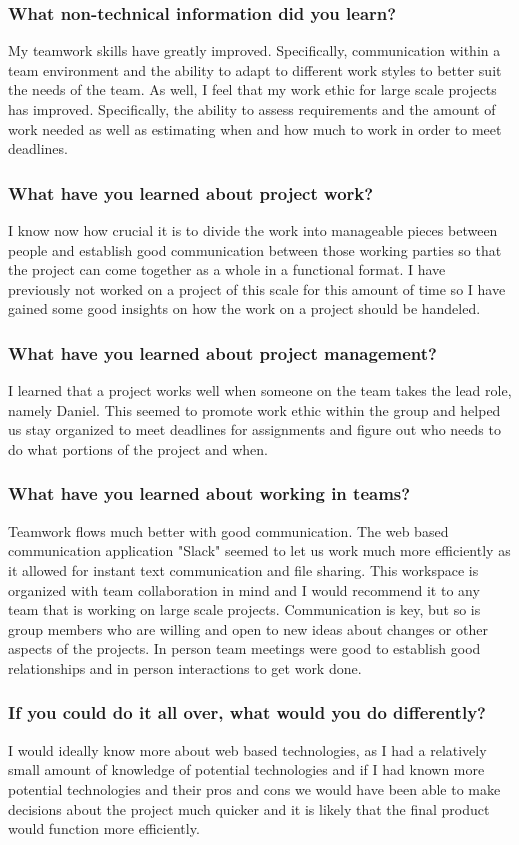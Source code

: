 \documentclass[journal,10pt,onecolumn,compsoc]{IEEEtran}
\begin{document}
    \subsubsection{What non-technical information did you learn?}
	My teamwork skills have greatly improved. Specifically, communication within a team environment and the ability to adapt to different work styles to better suit the needs of the team. As well, I feel that my work ethic for large scale projects has improved. Specifically, the ability to assess requirements and the amount of work needed as well as estimating when and how much to work in order to meet deadlines. 
    \subsubsection{What have you learned about project work?}
	I know now how crucial it is to divide the work into manageable pieces between people and establish good communication between those working parties so that the project can come together as a whole in a functional format. I have previously not worked on a project of this scale for this amount of time so I have gained some good insights on how the work on a project should be handeled.
    \subsubsection{What have you learned about project management?}
	I learned that a project works well when someone on the team takes the lead role, namely Daniel. This seemed to promote work ethic within the group and helped us stay organized to meet deadlines for assignments and figure out who needs to do what portions of the project and when.
    \subsubsection{What have you learned about working in teams?}
	Teamwork flows much better with good communication. The web based communication application "Slack" seemed to let us work much more efficiently as it allowed for instant text communication and file sharing. This workspace is organized with team collaboration in mind and I would recommend it to any team that is working on large scale projects. Communication is key, but so is group members who are willing and open to new ideas about changes or other aspects of the projects. In person team meetings were good to establish good relationships and in person interactions to get work done. 
    \subsubsection{If you could do it all over, what would you do differently?} 
	I would ideally know more about web based technologies, as I had a relatively small amount of knowledge of potential technologies and if I had known more potential technologies and their pros and cons we would have been able to make decisions about the project much quicker and it is likely that the final product would function more efficiently. 
\end{document}

